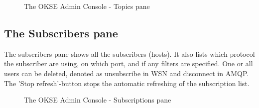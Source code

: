 \begin{center}
  \begin{figure}[ht!]
    \caption{The OKSE Admin Console - Topics pane} 
    \label{fig:OKSE Admin Console - Topics pane}
  \end{figure}
\end{center}

\subsection{The Subscribers pane}
The subscribers pane shows all the subscribers (hosts). It also lists which protocol the subscriber are using, on which port, and if any filters are specified. One or all users can be deleted, denoted as unsubscribe in WSN and disconnect in AMQP. The 'Stop refresh'-button stops the automatic refreshing of the subscription list.

\begin{center}
  \begin{figure}[ht!]
    \caption{The OKSE Admin Console - Subscriptions pane} 
    \label{fig:OKSE Admin Console - Subscriptions pane}
  \end{figure}
\end{center}

